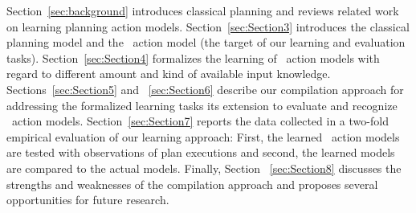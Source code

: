 Section~\ref{sec:background} introduces classical planning and reviews related work on learning planning action models. Section~\ref{sec:Section3} introduces the classical planning model and the \strips\ action model (the target of our learning and evaluation tasks). Section~\ref{sec:Section4} formalizes the learning of \strips\ action models with regard to different amount and kind of available input knowledge. Sections~\ref{sec:Section5} and ~\ref{sec:Section6} describe our compilation approach for addressing the formalized learning tasks its extension to evaluate and recognize \strips\ action models. Section~\ref{sec:Section7} reports the data collected in a two-fold empirical evaluation of our learning approach: First, the learned \strips\ action models are tested with observations of plan executions and second, the learned models are compared to the actual models. Finally, Section ~\ref{sec:Section8} discusses the strengths and weaknesses of the compilation approach and proposes several opportunities for future research.

 
